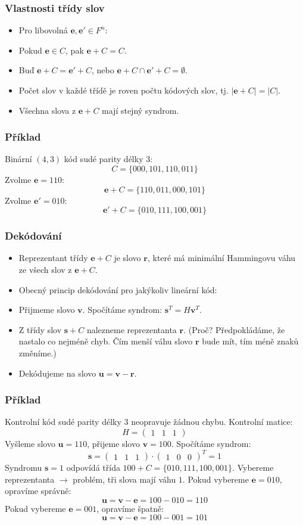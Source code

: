 \documentclass{beamer}
\newcommand{\vu}{\textbf{u}}
\newcommand{\vv}{\textbf{v}}
\newcommand{\e}{\textbf{e}}
\newcommand{\s}{\textbf{s}}
\newcommand{\vr}{\textbf{r}}
\newenvironment{itemizex}%
  {\large \begin{itemize}%
    \setlength{\itemsep}{8pt}%
    \setlength{\parskip}{8pt}}%
  {\end{itemize}}
\begin{document}
\begin{frame}[t,fragile]\frametitle{Vlastnosti třídy slov} 
    \begin{itemizex}
        \item Pro libovolná $\e, \e' \in F^n$:
        \item Pokud $\e\in C$, pak $\e+C=C$.
        \item Buď $\e+C=\e'+C$, nebo $\e+C\cap \e'+C=\emptyset$.
        \item Počet slov v každé třídě je roven počtu kódových slov, tj. $|\e+C|=|C|$.
        \item Všechna slova z $\e+C$ mají stejný syndrom.
    \end{itemizex}
\end{frame}


\begin{frame}[t,fragile]\frametitle{Příklad} 
Binární $(4,3)$ kód sudé parity délky $3$:
$$
C=\{000, 101, 110, 011\}
$$
Zvolme $\e=110$:
$$
\e+C=\{110, 011, 000, 101\}
$$
Zvolme $\e'=010$:
$$
\e'+C=\{010, 111, 100, 001\}
$$
\end{frame}


\begin{frame}[t,fragile]\frametitle{Dekódování} 
    \begin{itemizex}
        \item Reprezentant třídy $\e+C$ je slovo $\vr$, které má minimální Hammingovu váhu ze všech slov z $\e+C$.
        \item Obecný princip dekódování pro jakýkoliv lineární kód:
        \item Přijmeme slovo $\vv$. Spočítáme syndrom: $\s^T=H\vv^T$.
        \item Z třídy slov $\s+C$ nalezneme reprezentanta $\vr$. (Proč? Předpokládáme, že nastalo co nejméně chyb. Čím menší váhu slovo $\vr$ bude mít, tím méně znaků změníme.)
        \item Dekódujeme na slovo $\vu=\vv-\vr$.
    \end{itemizex}
\end{frame}


\begin{frame}[t,fragile]\frametitle{Příklad} 
Kontrolní kód sudé parity délky $3$ neopravuje žádnou chybu. Kontrolní matice:
$$
H=
\begin{pmatrix}
1&1&1
\end{pmatrix}
$$
Vyšleme slovo $\vu=110$, přijeme slovo $\vv=100$. Spočítáme syndrom:
$$
\s=
\begin{pmatrix}
1&1&1
\end{pmatrix}
\cdot
\begin{pmatrix}
1&0&0
\end{pmatrix}^T
=1
$$
Syndromu $\s=1$ odpovídá třída $100+C=\{010, 111, 100, 001\}$. Vybereme reprezentanta $\longrightarrow$ problém, tři slova mají váhu $1$. Pokud vybereme $\e=010$, opravíme správně:
$$
\vu=\vv-\e=100-010=110
$$
Pokud vybereme $\e=001$, opravíme špatně:
$$
\vu=\vv-\e=100-001=101
$$
\end{frame}
\end{document}
